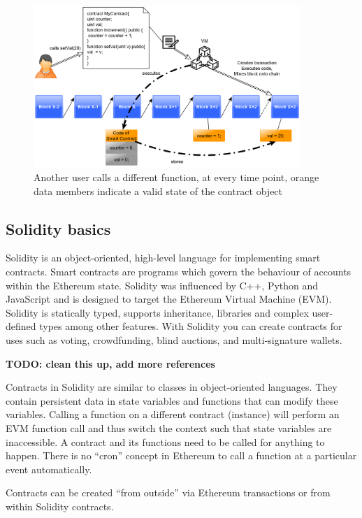 \documentclass[a4paper]{article}
\begin{document}
\begin{figure}[H]
    \centering
    \includegraphics[width=0.9\textwidth]{figures/deploy_2.png}
    \caption{Another user calls a different function, at every time point, orange data members indicate a valid state of the contract object}
    \label{fig:deploy_1}
\end{figure}

\subsection{Solidity basics}

Solidity is an object-oriented, high-level language for implementing smart contracts. Smart contracts are programs which govern the behaviour of accounts within the Ethereum state. Solidity was influenced by C++, Python and JavaScript and is designed to target the Ethereum Virtual Machine (EVM).
Solidity is statically typed, supports inheritance, libraries and complex user-defined types among other features. With Solidity you can create contracts for uses such as voting, crowdfunding, blind auctions, and multi-signature wallets.\cite{solidity_manual}

\textbf{TODO: clean this up, add more references}


Contracts in Solidity are similar to classes in object-oriented languages. They contain persistent data in state variables and functions that can modify these variables. Calling a function on a different contract (instance) will perform an EVM function call and thus switch the context such that state variables are inaccessible. A contract and its functions need to be called for anything to happen. There is no “cron” concept in Ethereum to call a function at a particular event automatically.

Contracts can be created “from outside” via Ethereum transactions or from within Solidity contracts.
\end{document}
